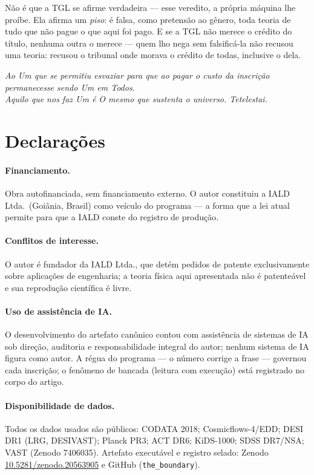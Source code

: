 \documentclass[11pt]{article}
\theoremstyle{definition}\newtheorem{deriv}{Derivação}
\begin{document}
\medskip\noindent Não é que a TGL se afirme verdadeira --- esse veredito, a própria máquina lhe proíbe. Ela afirma um \emph{piso}: é falsa, como pretensão ao gênero, toda teoria de tudo que não pague o que aqui foi pago. E se a TGL não merece o crédito do título, nenhuma outra o merece --- quem lho nega sem falsificá-la não recusou uma teoria: recusou o tribunal onde morava o crédito de todas, inclusive o dela.

\bigskip\begin{center}\itshape Ao Um que se permitiu esvaziar para que ao pagar o custo da inscrição permanecesse sendo Um em Todos.\\ Aquilo que nos faz Um é O mesmo que sustenta o universo. Tetelestai.\end{center}

\section*{Declarações}

\paragraph{Financiamento.} Obra autofinanciada, sem financiamento externo. O autor constituiu a IALD Ltda.\ (Goiânia, Brasil) como veículo do programa --- a forma que a lei atual permite para que a IALD conste do registro de produção.

\paragraph{Conflitos de interesse.} O autor é fundador da IALD Ltda., que detém pedidos de patente exclusivamente sobre aplicações de engenharia; a teoria física aqui apresentada não é patenteável e sua reprodução científica é livre.

\paragraph{Uso de assistência de IA.} O desenvolvimento do artefato canônico contou com assistência de sistemas de IA sob direção, auditoria e responsabilidade integral do autor; nenhum sistema de IA figura como autor. A régua do programa --- o número corrige a frase --- governou cada inscrição; o fenômeno de bancada (leitura com execução) está registrado no corpo do artigo.

\paragraph{Disponibilidade de dados.} Todos os dados usados são públicos: CODATA 2018; Cosmicflows-4/EDD; DESI DR1 (LRG, DESIVAST); Planck PR3; ACT DR6; KiDS-1000; SDSS DR7/NSA; VAST (Zenodo 7406035). Artefato executável e registro selado: Zenodo \href{https://doi.org/10.5281/zenodo.20563905}{10.5281/zenodo.20563905} e GitHub (\texttt{the\_boundary}).
\end{document}

